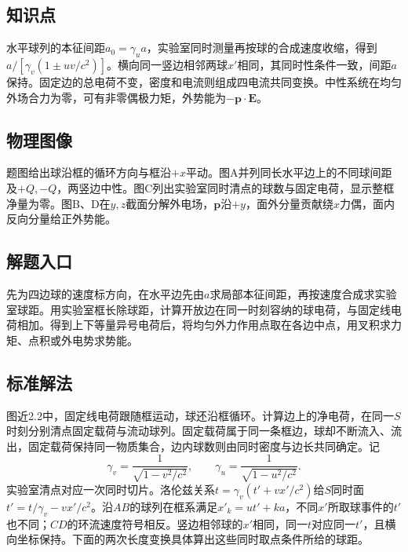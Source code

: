 \documentclass[UTF8,fontset=fandol,a4paper,11pt]{ctexart}
\begin{document}


\subsection*{知识点}

水平球列的本征间距$a_0=\gamma_u a$，实验室同时测量再按球的合成速度收缩，得到$a/[\gamma_v(1\pm uv/c^2)]$。横向同一竖边相邻两球$x'$相同，其同时性条件一致，间距$a$保持。固定边的总电荷不变，密度和电流则组成四电流共同变换。中性系统在均匀外场合力为零，可有非零偶极力矩，外势能为$-\boldsymbol p\cdot\boldsymbol E$。



\subsection*{物理图像}

题图给出球沿框的循环方向与框沿$+x$平动。图A并列同长水平边上的不同球间距及$+Q,-Q$，两竖边中性。图C列出实验室同时清点的球数与固定电荷，显示整框净量为零。图B、D在$y,z$截面分解外电场，$\boldsymbol p$沿$+y$，面外分量贡献绕$x$力偶，面内反向分量给正外势能。



\subsection*{解题入口}

先为四边球的速度标方向，在水平边先由$a$求局部本征间距，再按速度合成求实验室球距。用实验室框长除球距，计算开放边在同一时刻容纳的球电荷，与固定线电荷相加。得到上下等量异号电荷后，将均匀外力作用点取在各边中点，用叉积求力矩、点积或外电势求势能。



\subsection*{标准解法}


图近2.2中，固定线电荷跟随框运动，球还沿框循环。计算边上的净电荷，在同一$S$时刻分别清点固定载荷与流动球列。固定载荷属于同一条框边，球却不断流入、流出，固定载荷保持同一物质集合，边内球数则由同时密度与边长共同确定。记
\[
\gamma_v=\frac1{\sqrt{1-v^2/c^2}},\qquad
\gamma_u=\frac1{\sqrt{1-u^2/c^2}}.
\]
实验室清点对应一次同时切片。洛伦兹关系$t=\gamma_v(t'+vx'/c^2)$给$S$同时面$t'=t/\gamma_v-vx'/c^2$。沿$AB$的球列在框系满足$x'_k=ut'+ka$，不同$x'$所取球事件的$t'$也不同；$CD$的环流速度符号相反。竖边相邻球的$x'$相同，同一$t$对应同一$t'$，且横向坐标保持。下面的两次长度变换具体算出这些同时取点条件所给的球距。
\end{document}
